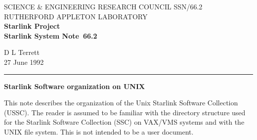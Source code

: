 \pagestyle{myheadings}

\newcommand{\stardoccategory}  {Starlink System Note}
\newcommand{\stardocinitials}  {SSN}
\newcommand{\stardocnumber}    {66.2}
\newcommand{\stardocauthors}   {D L Terrett}
\newcommand{\stardocdate}      {27 June 1992}
\newcommand{\stardoctitle}     {Starlink Software organization on UNIX}

\newcommand{\stardocname}{\stardocinitials /\stardocnumber}
\renewcommand{\_}{{\tt\char'137}}     %
\markright{\stardocname}
\setlength{\textwidth}{160mm}
\setlength{\textheight}{240mm}
\setlength{\topmargin}{-5mm}
\setlength{\oddsidemargin}{0mm}
\setlength{\evensidemargin}{0mm}
\setlength{\parindent}{0mm}
\setlength{\parskip}{\medskipamount}
\setlength{\unitlength}{1mm}



\thispagestyle{empty}
SCIENCE \& ENGINEERING RESEARCH COUNCIL \hfill \stardocname\\
RUTHERFORD APPLETON LABORATORY\\
{\large\bf Starlink Project\\}
{\large\bf \stardoccategory\ \stardocnumber}
\begin{flushright}
\stardocauthors\\
\stardocdate
\end{flushright}
\vspace{-4mm}
\rule{\textwidth}{0.5mm}
\vspace{5mm}
\begin{center}
{\Large\bf \stardoctitle}
\end{center}
\vspace{5mm}


This note describes the organization of the Unix Starlink Software
Collection (USSC). The reader is assumed to be familiar with the
directory structure used for the Starlink Software Collection (SSC)
on VAX/VMS systems and with the UNIX file
system. This is not intended to be a user document.

